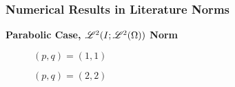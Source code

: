 \begin{frame}
    \frametitle{Numerical Results in Literature Norms}

    \vspace*{\fill}
    \begin{center}
        {\color{\accentcolor} \Large \textbf{Parabolic Case, $\mathscr{L}^{2}(I; \mathscr{L}^{2}(\Omega))$ Norm}}
    \end{center}

    \vspace*{\fill}

    \begin{multicols}{2}

        \begin{center}
            \begin{minipage}{0.45\textwidth}
                \begin{figure}[!ht]
                    \caption{$\left( p, q  \right) = \left( 1, 1  \right)$}
                    \label{fig:p_1_1_par_l2l2}
                    
                \end{figure}
            \end{minipage}
        \end{center}
        \vspace*{\fill}

        \vfill\null
        \columnbreak

        \begin{center}
            \begin{minipage}{0.45\textwidth}
                \begin{figure}[!ht]
                    \caption{$\left( p, q  \right) = \left( 2, 2  \right)$}
                    \label{fig:p_2_2_par_l2l2}
                    
                \end{figure}
            \end{minipage}
        \end{center}
        \vspace*{\fill}

    \end{multicols}
    \vspace*{\fill}
    
\end{frame}

